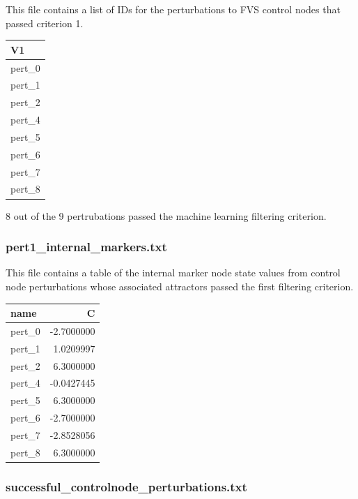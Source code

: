 \documentclass[
]{book}
\theoremstyle{definition}
\theoremstyle{definition}
\theoremstyle{definition}
\theoremstyle{definition}
\theoremstyle{remark}
\begin{document}
This file contains a list of IDs for the perturbations to FVS control nodes that passed criterion 1.

\begin{tabular}{l}
\hline
V1\\
\hline
pert\_0\\
\hline
pert\_1\\
\hline
pert\_2\\
\hline
pert\_4\\
\hline
pert\_5\\
\hline
pert\_6\\
\hline
pert\_7\\
\hline
pert\_8\\
\hline
\end{tabular}

8 out of the 9 pertrubations passed the machine learning filtering criterion.

\hypertarget{section-id}{%
\subsubsection*{pert1\_internal\_markers.txt}\label{section-id}}

This file contains a table of the internal marker node state values from control node perturbations whose associated attractors passed the first filtering criterion.

\begin{tabular}{l|r}
\hline
name & C\\
\hline
pert\_0 & -2.7000000\\
\hline
pert\_1 & 1.0209997\\
\hline
pert\_2 & 6.3000000\\
\hline
pert\_4 & -0.0427445\\
\hline
pert\_5 & 6.3000000\\
\hline
pert\_6 & -2.7000000\\
\hline
pert\_7 & -2.8528056\\
\hline
pert\_8 & 6.3000000\\
\hline
\end{tabular}

\hypertarget{section-id}{%
\subsubsection*{successful\_controlnode\_perturbations.txt}\label{section-id}}
\end{document}
